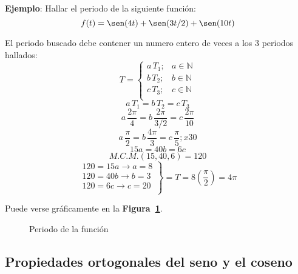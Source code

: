 \textbf{Ejemplo}: Hallar el periodo de la siguiente función:
\begin{equation*}
    f(t)=\sen(4t)+\sen(3t/2)+\sen(10t)
\end{equation*}

El periodo buscado debe contener un numero entero de veces a los 3 periodos
hallados:
\begin{equation*}
    T=\begin{cases}
        a\,T_1; & a\in\mathbb{N}\\
        b\,T_2; & b\in\mathbb{N}\\
        c\,T_3; & c\in\mathbb{N}\\
    \end{cases}
\end{equation*}
\begin{equation*}
    a\,T_1=b\,T_2=c\,T_3
\end{equation*}
\begin{equation*}
    a\,\frac{2\pi}{4}=b\,\frac{2\pi}{3/2}=c\,\frac{2\pi}{10}
\end{equation*}
\begin{equation*}
    a\,\frac{\pi}{2}=b\,\frac{4\pi}{3}=c\,\frac{\pi}{5};x30
\end{equation*}
\begin{equation*}
    15a=40b=6c
\end{equation*}
\begin{equation*}
    M.C.M.(15,40,6)=120
\end{equation*}
\begin{equation*}
\left.\begin{aligned}
    120=15a\rightarrow a=8\\
    120=40b\rightarrow b=3\\
    120=6c\rightarrow c=20\\
\end{aligned}\right\}=T=8\left(\frac{\pi}{2}\right)=4\pi
\end{equation*}

Puede verse gráficamente en la \textbf{Figura~\ref{figura_06}}.
\begin{figure}[H]
    \centering
    
    \caption{Periodo de la función}\label{figura_06}
\end{figure}

\subsection{Propiedades ortogonales del seno y el coseno}
